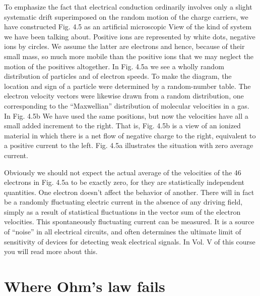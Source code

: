 To emphasize the fact that electrical conduction ordinarily involves
only a slight systematic drift superimposed on the random motion
of the charge carriers, we have constructed Fig. 4.5 as an artificial
microscopic View of the kind of system we have been talking about.
Positive ions are represented by white dots, negative ions by circles.
We assume the latter are electrons and hence, because of their small
mass, so much more mobile than the positive ions that we may neglect
the motion of the positives altogether. In Fig. 4.5a we see a wholly
random distribution of particles and of electron speeds. To make
the diagram, the location and sign of a particle were determined by a
random-number table. The electron velocity vectors were likewise
drawn from a random distribution, one corresponding to the ``Maxwellian''
distribution of molecular velocities in a gas. In Fig. 4.5b
We have used the same positions, but now the velocities have all a
small added increment to the right. That is, Fig. 4.5b is a view of
an ionized material in which there is a net flow of negative charge to
the right, equivalent to a positive current to the left. Fig. 4.5a illustrates
the situation with zero average current.

Obviously we should not expect the actual average of the velocities
of the 46 electrons in Fig. 4.5a to be exactly zero, for they are statistically
independent quantities. One electron doesn't affect the behavior
of another. There will in fact be a randomly ffuctuating
electric current in the absence of any driving field, simply as a result
of statistical fluctuations in the vector sum of the electron velocities.
This spontaneously fluctuating current can be measured. It is a
source of ``noise'' in all electrical circuits, and often determines the
ultimate limit of sensitivity of devices for detecting weak electrical
signals. In Vol. V of this course you will read more about this.

\section{Where Ohm's law fails}

